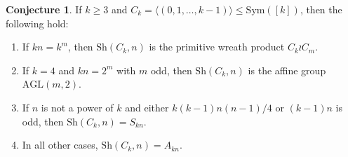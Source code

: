 \documentclass[11pt,a4paper,reqno]{amsart}
\newcommand{\AGL}{\mathrm{AGL}}
\newcommand{\Sym}{\mathrm{Sym}}
\newcommand{\Sh}{\mathrm{Sh}}
\theoremstyle{definition}
\newtheorem{conjecture}[theorem]{Conjecture}
\begin{document}
\begin{conjecture}\label{conj:C_k}
  If $k\geq 3$ and $C_k=\langle(0,1,\ldots,k-1)\rangle\leq \Sym([k])$, then the following hold:
      \begin{enumerate}[\rm(a)]
            \item If $kn=k^m$, then $\Sh(C_k,n)$ is the primitive wreath product $C_k\wr C_m$.
            \item If $k=4$ and $kn=2^m$ with $m$ odd,  then $\Sh(C_k,n)$ is the affine group $\AGL(m,2)$.
            \item If $n$ is not a power of $k$ and either $k(k-1)n(n-1)/4$ or $(k-1)n$ is odd, then $\Sh(C_k,n)=S_{kn}$.
            \item In all other cases, $\Sh(C_k,n)=A_{kn}$.
      \end{enumerate}
\end{conjecture}
\end{document}
